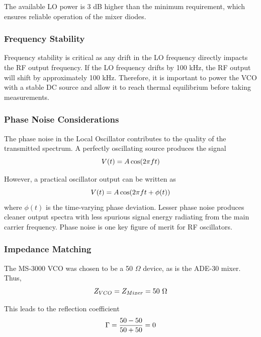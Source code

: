 \documentclass[12pt,a4paper]{report}
\begin{document}
	The available LO power is 3 dB higher than the minimum requirement, which ensures reliable operation of the mixer diodes.
	
	\subsubsection{Frequency Stability}
	Frequency stability is critical as any drift in the LO frequency directly impacts the RF output frequency. If the LO frequency drifts by 100 kHz, the RF output will shift by approximately 100 kHz. Therefore, it is important to power the VCO with a stable DC source and allow it to reach thermal equilibrium before taking measurements.
	\subsubsection{Phase Noise Considerations}
	The phase noise in the Local Oscillator contributes to the quality of the transmitted spectrum. A perfectly oscillating source produces the signal
	\begingroup
	\setlength{\mathindent}{0pt}
	\begin{equation*}
		\hfill
		V(t) = A \cos(2\pi f t)
		\hfill
	\end{equation*}
	\endgroup
	
	However, a practical oscillator output can be written as
	\begingroup
	\setlength{\mathindent}{0pt}
	\begin{equation*}
		\hfill
		V(t) = A \cos(2\pi f t + \phi(t))
		\hfill
	\end{equation*}
	\endgroup
	where $\phi(t)$ is the time-varying phase deviation. Lesser phase noise produces cleaner output spectra with less spurious signal energy radiating from the main carrier frequency. Phase noise is one key figure of merit for RF oscillators.
	\subsubsection{Impedance Matching}
	The MS-3000 VCO was chosen to be a 50 $\Omega$ device, as is the ADE-30 mixer. Thus,
	\begingroup
	\setlength{\mathindent}{0pt}
	\begin{equation*}
		\hfill
		Z_{VCO} = Z_{Mixer} = 50\ \Omega
		\hfill
	\end{equation*}
	\endgroup
	
	This leads to the reflection coefficient
	\begingroup
	\setlength{\mathindent}{0pt}
	\begin{equation*}
		\hfill
		\Gamma = \frac{50 - 50}{50 + 50} = 0
		\hfill
	\end{equation*}
	\endgroup
	
\end{document}
